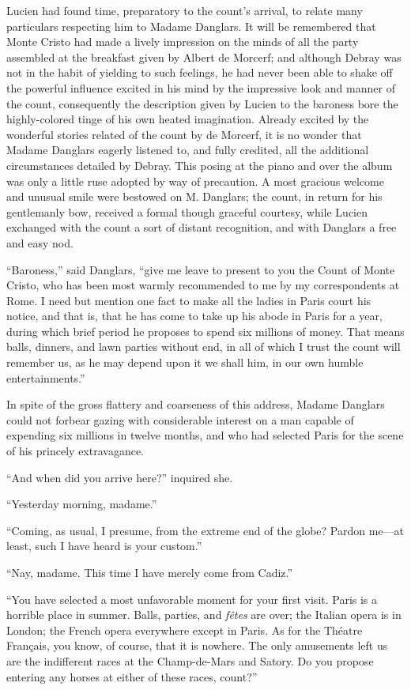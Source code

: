 Lucien had found time, preparatory to the count’s arrival, to relate
many particulars respecting him to Madame Danglars. It will be
remembered that Monte Cristo had made a lively impression on the minds
of all the party assembled at the breakfast given by Albert de Morcerf;
and although Debray was not in the habit of yielding to such feelings,
he had never been able to shake off the powerful influence excited in
his mind by the impressive look and manner of the count, consequently
the description given by Lucien to the baroness bore the highly-colored
tinge of his own heated imagination. Already excited by the wonderful
stories related of the count by de Morcerf, it is no wonder that Madame
Danglars eagerly listened to, and fully credited, all the additional
circumstances detailed by Debray. This posing at the piano and over the
album was only a little ruse adopted by way of precaution. A most
gracious welcome and unusual smile were bestowed on M. Danglars; the
count, in return for his gentlemanly bow, received a formal though
graceful courtesy, while Lucien exchanged with the count a sort of
distant recognition, and with Danglars a free and easy nod.

“Baroness,” said Danglars, “give me leave to present to you the Count
of Monte Cristo, who has been most warmly recommended to me by my
correspondents at Rome. I need but mention one fact to make all the
ladies in Paris court his notice, and that is, that he has come to take
up his abode in Paris for a year, during which brief period he proposes
to spend six millions of money. That means balls, dinners, and lawn
parties without end, in all of which I trust the count will remember
us, as he may depend upon it we shall him, in our own humble
entertainments.”

In spite of the gross flattery and coarseness of this address, Madame
Danglars could not forbear gazing with considerable interest on a man
capable of expending six millions in twelve months, and who had
selected Paris for the scene of his princely extravagance.

“And when did you arrive here?” inquired she.

“Yesterday morning, madame.”

“Coming, as usual, I presume, from the extreme end of the globe? Pardon
me—at least, such I have heard is your custom.”

“Nay, madame. This time I have merely come from Cadiz.”

“You have selected a most unfavorable moment for your first visit.
Paris is a horrible place in summer. Balls, parties, and \textit{fêtes} are
over; the Italian opera is in London; the French opera everywhere
except in Paris. As for the Théatre Français, you know, of course, that
it is nowhere. The only amusements left us are the indifferent races at
the Champ-de-Mars and Satory. Do you propose entering any horses at
either of these races, count?”

